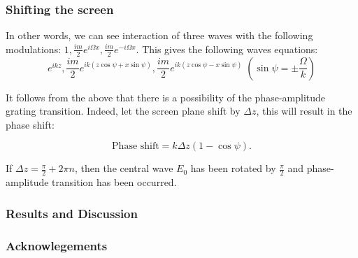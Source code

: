 \documentclass{beamer}
\begin{document}
		\begin{frame}
		\frametitle{Shifting the screen}

		In other words, we can see interaction of three waves with the following modulations:
		 $1, \frac{im}{2}e^{i \Omega x},\frac{im}{2}e^{-i \Omega x}$. This gives the following waves equations: 
		$$e^{i kz}, \frac{im}{2}e^{i k(z\cos{\psi} + x\sin{\psi})},\frac{im}{2}e^{i k(z\cos{\psi} - x\sin{\psi})} \; \left(\sin{\psi} = \pm\frac{\Omega}{k}  \right)$$
		
		
		It follows from the above that there is a possibility of the phase-amplitude grating transition. Indeed, let the screen plane shift by $\Delta z$, this will result in the phase shift:
		
		$$\text{Phase shift} = k\Delta z(1 - \cos{\psi}).$$
		
		
		If $\Delta z = \frac{\pi}{2} + 2\pi n$, then the central wave $E_0$ has been rotated by $\frac{\pi}{2}$ and phase-amplitude transition has been occurred.
	\end{frame}

	\begin{frame}
		\frametitle{Results and Discussion}
	\end{frame}

	\begin{frame}
		\frametitle{Acknowlegements}
	\end{frame}
	
	
\end{document}
